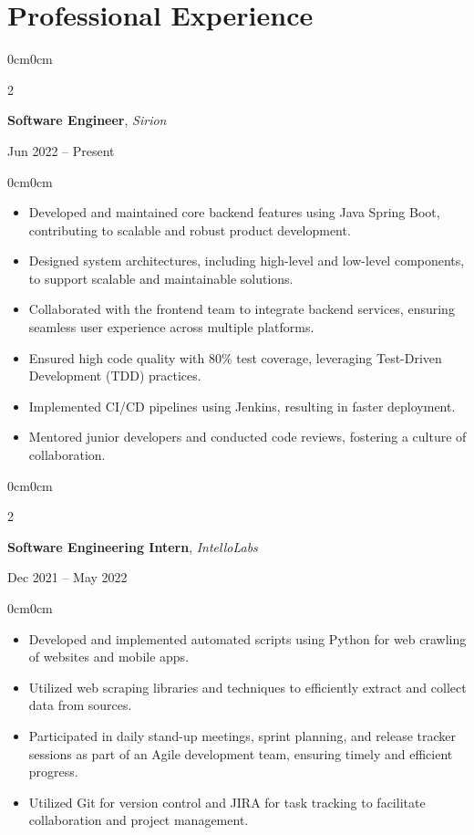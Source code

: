\documentclass[10pt, letterpaper]{article}
\newenvironment{highlights}{
    \begin{itemize}[topsep=0.05cm, parsep=0.05cm, partopsep=0pt, itemsep=0pt, leftmargin=10pt]
}{
    \end{itemize}
}
\newenvironment{onecolentry}{
    \begin{adjustwidth}{0cm}{0cm}
}{
    \end{adjustwidth}
}
\newenvironment{twocolentry}[2][]{
    \onecolentry
    \def\secondColumn{#2}
    \setcolumnwidth{\fill, 4.2cm}
    \begin{paracol}{2}
}{
    \switchcolumn \raggedleft \secondColumn
    \end{paracol}
    \endonecolentry
}
\begin{document}
\section{Professional Experience}

\begin{twocolentry}{Jun 2022 -- Present}
    \textbf{Software Engineer}, \textit{Sirion}
\end{twocolentry}
\begin{onecolentry}
    \begin{highlights}
        \item Developed and maintained core backend features using Java Spring Boot, contributing to scalable and robust product development.
        \item Designed system architectures, including high-level and low-level components, to support scalable and maintainable solutions.
        \item Collaborated with the frontend team to integrate backend services, ensuring seamless user experience across multiple platforms.
        \item Ensured high code quality with 80\% test coverage, leveraging Test-Driven Development (TDD) practices.
        \item Implemented CI/CD pipelines using Jenkins, resulting in faster deployment.
        \item Mentored junior developers and conducted code reviews, fostering a culture of collaboration.
    \end{highlights}
\end{onecolentry}

\vspace{0.08cm}

\begin{twocolentry}{Dec 2021 -- May 2022}
    \textbf{Software Engineering Intern}, \textit{IntelloLabs}
\end{twocolentry}
\begin{onecolentry}
    \begin{highlights}
        \item Developed and implemented automated scripts using Python for web crawling of websites and mobile apps.
        \item Utilized web scraping libraries and techniques to efficiently extract and collect data from sources.
        \item Participated in daily stand-up meetings, sprint planning, and release tracker sessions as part of an Agile development team, ensuring timely and efficient progress.
        \item Utilized Git for version control and JIRA for task tracking to facilitate collaboration and project management.
    \end{highlights}
\end{onecolentry}
\end{document}
